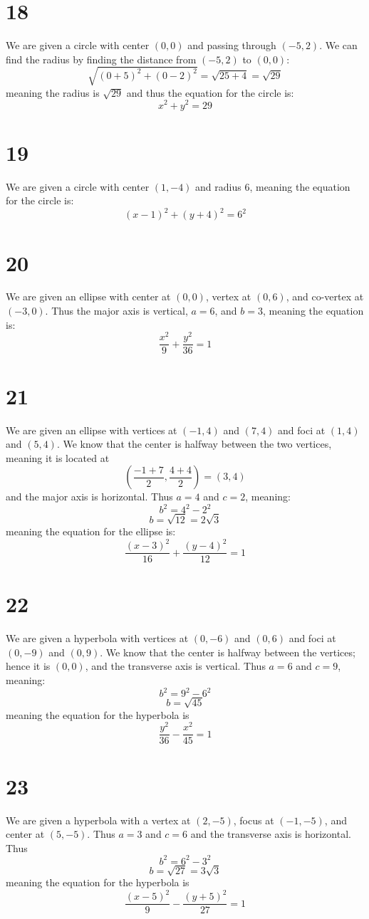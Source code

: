 \documentclass{article}
\theoremstyle{definition}
\newcommand{\?}{\stackrel{?}{=}}
\begin{document}
\section*{18}
We are given a circle with center $(0,0)$ and passing through $(-5,2)$. We can find the radius by finding the distance from $(-5,2)$ to $(0,0)$:
\[ \sqrt{(0+5)^2+(0-2)^2}=\sqrt{25+4}=\sqrt{29} \] meaning the radius is $\sqrt{29}$ and thus the equation for the circle is:
\[ x^2+y^2=29 \]

\section*{19}
We are given a circle with center $(1,-4)$ and radius 6, meaning the equation for the circle is:
\[ (x-1)^2+(y+4)^2=6^2 \]

\section*{20}
We are given an ellipse with center at $(0,0)$, vertex at $(0,6)$, and co-vertex at $(-3,0)$. Thus the major axis is vertical, 
$a=6$, and $b=3$, meaning the equation is:
\[ \frac{x^2}{9}+\frac{y^2}{36}=1 \]

\section*{21}
We are given an ellipse with vertices at $(-1,4)$ and $(7,4)$ and foci at $(1,4)$ and $(5,4)$. We know that the center is halfway between the two vertices, meaning it is located at
\[ (\frac{-1+7}{2},\frac{4+4}{2})=(3,4) \] and the major axis is horizontal. Thus $a=4$ and $c=2$, meaning:
\[ b^2=4^2-2^2 \] \[ b=\sqrt{12}=2\sqrt{3} \] meaning the equation for the ellipse is:
\[ \frac{(x-3)^2}{16}+\frac{(y-4)^2}{12}=1 \]

\section*{22}
We are given a hyperbola with vertices at $(0,-6)$ and $(0,6)$ and foci at $(0,-9)$ and $(0,9)$. We know that the center is halfway between the vertices; hence it is 
$(0,0)$, and the transverse axis is vertical. Thus $a=6$ and $c=9$, meaning:
\[ b^2=9^2-6^2 \] \[ b=\sqrt{45} \] meaning the equation for the hyperbola is
\[ \frac{y^2}{36}-\frac{x^2}{45}=1 \]

\section*{23}
We are given a hyperbola with a vertex at $(2,-5)$, focus at $(-1,-5)$, and center at $(5,-5)$. Thus $a=3$ and $c=6$ and the transverse axis is horizontal. Thus
\[ b^2=6^2-3^2 \] \[ b=\sqrt{27}=3\sqrt{3} \] meaning the equation for the hyperbola is
\[ \frac{(x-5)^2}{9}-\frac{(y+5)^2}{27}=1 \]
\end{document}
